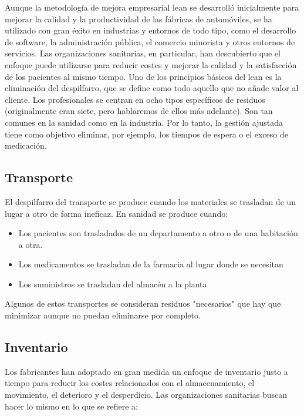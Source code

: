 Aunque la metodología de mejora empresarial lean se desarrolló inicialmente para mejorar la calidad y la productividad de las fábricas de automóviles, se ha utilizado con gran éxito en industrias y entornos de todo tipo, como el desarrollo de software, la administración pública, el comercio minorista y otros entornos de servicios. Las organizaciones sanitarias, en particular, han descubierto que el enfoque puede utilizarse para reducir costes y mejorar la calidad y la satisfacción de los pacientes al mismo tiempo. Uno de los principios básicos del lean es la eliminación del despilfarro, que se define como todo aquello que no añade valor al cliente. Los profesionales se centran en ocho tipos específicos de residuos (originalmente eran siete, pero hablaremos de ellos más adelante). Son tan comunes en la sanidad como en la industria. Por lo tanto, la gestión ajustada tiene como objetivo eliminar, por ejemplo, los tiempos de espera o el exceso de medicación.

\subsection{Transporte}

El despilfarro del transporte se produce cuando los materiales se trasladan de un lugar a otro de forma ineficaz. En sanidad se produce cuando:

\begin{itemize}
    \item Los pacientes son trasladados de un departamento a otro o de una habitación a otra.
    \item Los medicamentos se trasladan de la farmacia al lugar donde se necesitan
    \item Los suministros se trasladan del almacén a la planta
\end{itemize}

Algunos de estos transportes se consideran residuos "necesarios" que hay que minimizar aunque no puedan eliminarse por completo.

\subsection{Inventario}

Los fabricantes han adoptado en gran medida un enfoque de inventario justo a tiempo para reducir los costes relacionados con el almacenamiento, el movimiento, el deterioro y el desperdicio. Las organizaciones sanitarias buscan hacer lo mismo en lo que se refiere a:

